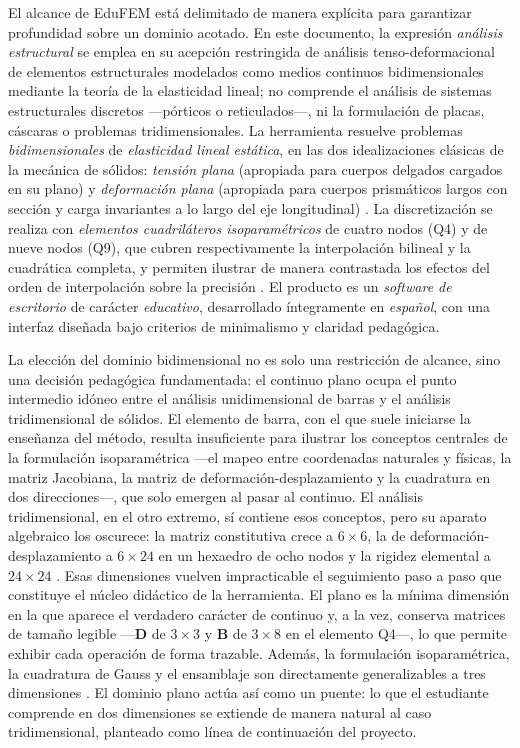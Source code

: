 El alcance de EduFEM está delimitado de manera explícita para garantizar profundidad sobre un dominio acotado. En este documento, la expresión \emph{análisis estructural} se emplea en su acepción restringida de análisis tenso-deformacional de elementos estructurales modelados como medios continuos bidimensionales mediante la teoría de la elasticidad lineal; no comprende el análisis de sistemas estructurales discretos —pórticos o reticulados—, ni la formulación de placas, cáscaras o problemas tridimensionales. La herramienta resuelve problemas \emph{bidimensionales} de \emph{elasticidad lineal estática}, en las dos idealizaciones clásicas de la mecánica de sólidos: \emph{tensión plana} (apropiada para cuerpos delgados cargados en su plano) y \emph{deformación plana} (apropiada para cuerpos prismáticos largos con sección y carga invariantes a lo largo del eje longitudinal) \autocite[p.~11]{timoshenko1970elasticity}. La discretización se realiza con \emph{elementos cuadriláteros isoparamétricos} de cuatro nodos (Q4) y de nueve nodos (Q9), que cubren respectivamente la interpolación bilineal y la cuadrática completa, y permiten ilustrar de manera contrastada los efectos del orden de interpolación sobre la precisión \autocites[pp.~137-138]{hughes2000fem}[pp.~164, 183-184]{onate2009structural}. El producto es un \emph{software de escritorio} de carácter \emph{educativo}, desarrollado íntegramente en \emph{español}, con una interfaz diseñada bajo criterios de minimalismo y claridad pedagógica.

La elección del dominio bidimensional no es solo una restricción de alcance, sino una decisión pedagógica fundamentada: el continuo plano ocupa el punto intermedio idóneo entre el análisis unidimensional de barras y el análisis tridimensional de sólidos. El elemento de barra, con el que suele iniciarse la enseñanza del método, resulta insuficiente para ilustrar los conceptos centrales de la formulación isoparamétrica —el mapeo entre coordenadas naturales y físicas, la matriz Jacobiana, la matriz de deformación-desplazamiento y la cuadratura en dos direcciones—, que solo emergen al pasar al continuo. El análisis tridimensional, en el otro extremo, sí contiene esos conceptos, pero su aparato algebraico los oscurece: la matriz constitutiva crece a $6\times6$, la de deformación-desplazamiento a $6\times24$ en un hexaedro de ocho nodos y la rigidez elemental a $24\times24$ \autocite[p.~218]{cook2002concepts}. Esas dimensiones vuelven impracticable el seguimiento paso a paso que constituye el núcleo didáctico de la herramienta. El plano es la mínima dimensión en la que aparece el verdadero carácter de continuo y, a la vez, conserva matrices de tamaño legible —$\bm{D}$ de $3\times3$ y $\bm{B}$ de $3\times8$ en el elemento Q4—, lo que permite exhibir cada operación de forma trazable. Además, la formulación isoparamétrica, la cuadratura de Gauss y el ensamblaje son directamente generalizables a tres dimensiones \autocite{bathe2014fem,zienkiewicz2013fem}. El dominio plano actúa así como un puente: lo que el estudiante comprende en dos dimensiones se extiende de manera natural al caso tridimensional, planteado como línea de continuación del proyecto.

